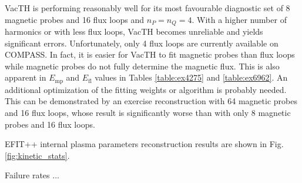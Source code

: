 VacTH is performing reasonably well for its most favourable diagnostic set of 8 magnetic probes and 16 flux loops and $n_P = n_Q = 4$. With a higher number of harmonics or with less flux loops, VacTH becomes unreliable and yields significant errors. Unfortunately, only 4 flux loops are currently available on COMPASS. In fact, it is easier for VacTH to fit magnetic probes than flux loops while magnetic probes do not fully determine the magnetic flux. This is also apparent in $E_\mathrm{mp}$ and $E_\mathrm{fl}$ values in Tables \ref{table:ex4275} and \ref{table:ex6962}. An additional optimization of the fitting weights or algorithm is probably needed. This can be demonstrated by an exercise reconstruction with 64 magnetic probes and 16 flux loops, whose result is significantly worse than with only 8 magnetic probes and 16 flux loops.

EFIT++ internal plasma parameters reconstruction results are shown in Fig. \ref{fig:kinetic_stats}. 


Failure rates ...




